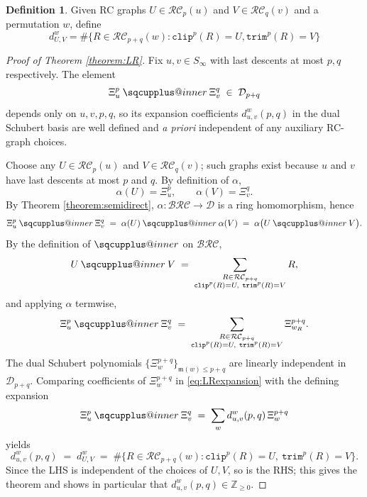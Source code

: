 \documentclass{amsart}
\makeatletter
\newcommand{\sqcupplus@inner}[2]{%
  \vcenter{\hbox{\ooalign{%
    \hfil$\m@th#1\sqcup$\hfil\cr
    \hfil\raisebox{0.15ex}{$\m@th#1\scriptscriptstyle+$}\hfil\cr
  }}}%
}
\newcommand{\sqcupplus}{\mathbin{\mathpalette\sqcupplus@inner\relax}}
\newtheorem{proposition}[lemma]{Proposition}
\theoremstyle{definition}
\newtheorem{definition}[lemma]{Definition}
\theoremstyle{remark}
\numberwithin{equation}{subsection}
\newcommand{\wof}[1]{w_{#1}}
\newcommand{\trm}{\mathtt{trim}}
\newcommand{\clp}{\mathtt{clip}}
\newcommand{\BRC}{\mathcal{BRC}}
\newcommand{\RC}{\mathcal{RC}}
\newcommand{\dsch}{\ensuremath{\Xi}}
\newcommand{\dcoma}{\mathcal{D}}
\newcommand{\maxd}{\mathfrak{m}}
\makeatother
\begin{document}


\begin{definition}
Given RC graphs $U\in \RC_p(u)$ and $V\in\RC_q(v)$ and a permutation $w$, define
$$d_{U, V}^w = \#\{R\in \RC_{p+q}(w): \clp^p(R)=U,\trm^p(R)=V\}$$
\end{definition}

\begin{proof}[Proof of Theorem \ref{theorem:LR}]
Fix $u,v\in S_\infty$ with last descents at most $p,q$ respectively. The element
$$\dsch_u^p\sqcupplus\dsch_v^q\;\in\;\dcoma_{p+q}$$
depends only on $u,v,p,q$, so its expansion coefficients $d_{u,v}^w(p,q)$ in the dual Schubert basis are well defined and \emph{a priori} independent of any auxiliary RC-graph choices.

Choose any $U\in\RC_p(u)$ and $V\in\RC_q(v)$; such graphs exist because $u$ and $v$ have last descents at most $p$ and $q$. By definition of $\alpha$,
$$\alpha(U)=\dsch_u^p,\qquad \alpha(V)=\dsch_v^q.$$
By Theorem \ref{theorem:semidirect}, $\alpha:\BRC\to\dcoma$ is a ring homomorphism, hence
$$\dsch_u^p\sqcupplus\dsch_v^q\;=\;\alpha(U)\sqcupplus\alpha(V)\;=\;\alpha\bigl(U\sqcupplus V\bigr).$$
By the definition of $\sqcupplus$ on $\BRC$,
$$U\sqcupplus V\;=\;\sum_{\substack{R\in\RC_{p+q}\\ \clp^p(R)=U,\ \trm^p(R)=V}} R,$$
and applying $\alpha$ termwise,
\begin{equation}\label{eq:LRexpansion}
\dsch_u^p\sqcupplus\dsch_v^q\;=\;\sum_{\substack{R\in\RC_{p+q}\\ \clp^p(R)=U,\ \trm^p(R)=V}}\dsch_{\wof{R}}^{p+q}.
\end{equation}
The dual Schubert polynomials $\{\dsch_w^{p+q}\}_{\maxd(w)\leq p+q}$ are linearly independent in $\dcoma_{p+q}$. Comparing coefficients of $\dsch_w^{p+q}$ in \eqref{eq:LRexpansion} with the defining expansion
$$\dsch_u^p\sqcupplus\dsch_v^q\;=\;\sum_w d_{u,v}^w(p,q)\,\dsch_w^{p+q}$$
yields
$$d_{u,v}^w(p,q)\;=\;d_{U,V}^w\;=\;\#\bigl\{R\in\RC_{p+q}(w):\clp^p(R)=U,\ \trm^p(R)=V\bigr\}.$$
Since the LHS is independent of the choices of $U,V$, so is the RHS; this gives the theorem and shows in particular that $d_{u,v}^w(p,q)\in\mathbb{Z}_{\geq 0}$.
\end{proof}
\end{document}

